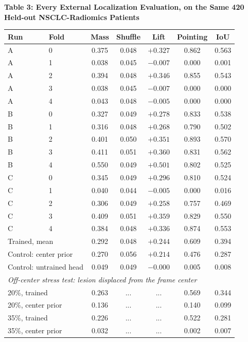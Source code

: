 \documentclass[11pt]{article}
\begin{document}
\clearpage
\begin{table}[H]
\textbf{Table 3: Every External Localization Evaluation, on the Same 420 Held-out
NSCLC-Radiomics Patients}

\medskip
\small
\begin{tabular}{llccccc}
\toprule
Run & Fold & Mass & Shuffle & Lift & Pointing & IoU \\
\midrule
A & 0 & 0.375 & 0.048 & $+0.327$ & 0.862 & 0.563 \\
A & 1 & 0.038 & 0.045 & $-0.007$ & 0.000 & 0.001 \\
A & 2 & 0.394 & 0.048 & $+0.346$ & 0.855 & 0.543 \\
A & 3 & 0.038 & 0.045 & $-0.007$ & 0.000 & 0.000 \\
A & 4 & 0.043 & 0.048 & $-0.005$ & 0.000 & 0.000 \\
\midrule
B & 0 & 0.327 & 0.049 & $+0.278$ & 0.833 & 0.538 \\
B & 1 & 0.316 & 0.048 & $+0.268$ & 0.790 & 0.502 \\
B & 2 & 0.401 & 0.050 & $+0.351$ & 0.893 & 0.570 \\
B & 3 & 0.411 & 0.051 & $+0.360$ & 0.831 & 0.562 \\
B & 4 & 0.550 & 0.049 & $+0.501$ & 0.802 & 0.525 \\
\midrule
C & 0 & 0.345 & 0.049 & $+0.296$ & 0.810 & 0.524 \\
C & 1 & 0.040 & 0.044 & $-0.005$ & 0.000 & 0.016 \\
C & 2 & 0.306 & 0.049 & $+0.258$ & 0.757 & 0.469 \\
C & 3 & 0.409 & 0.051 & $+0.359$ & 0.829 & 0.550 \\
C & 4 & 0.384 & 0.048 & $+0.336$ & 0.874 & 0.553 \\
\midrule
\multicolumn{2}{l}{Trained, mean} & 0.292 & 0.048 & $+0.244$ & 0.609 & 0.394 \\
\multicolumn{2}{l}{Control: center prior} & 0.270 & 0.056 & $+0.214$ & 0.476 & 0.287 \\
\multicolumn{2}{l}{Control: untrained head} & 0.049 & 0.049 & $-0.000$ & 0.005 & 0.008 \\
\midrule
\multicolumn{7}{l}{\textit{Off-center stress test: lesion displaced from the frame center}}\\
\multicolumn{2}{l}{20\%, trained} & 0.263 & ... & ... & 0.569 & 0.344 \\
\multicolumn{2}{l}{20\%, center prior} & 0.136 & ... & ... & 0.140 & 0.099 \\
\multicolumn{2}{l}{35\%, trained} & 0.226 & ... & ... & 0.522 & 0.281 \\
\multicolumn{2}{l}{35\%, center prior} & 0.032 & ... & ... & 0.002 & 0.007 \\
\bottomrule
\end{tabular}


\end{table}
\end{document}
